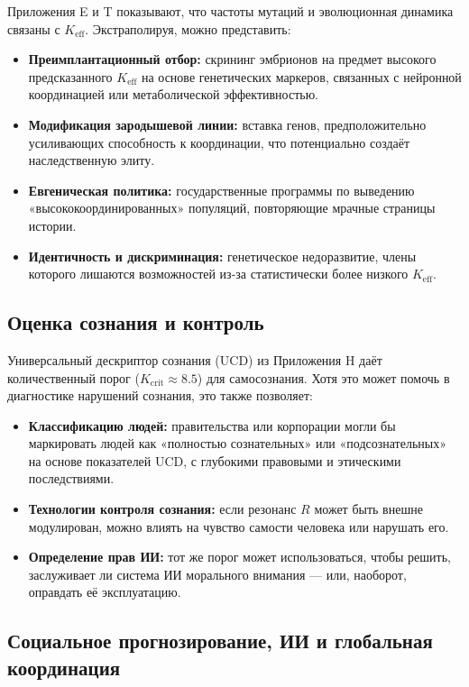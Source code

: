 \documentclass[12pt,a4paper]{article}
\theoremstyle{remark}
\newcommand{\Keff}{K_{\mathrm{eff}}}
\newcommand{\Kcrit}{K_{\mathrm{crit}}}
\begin{document}
	Приложения E и T показывают, что частоты мутаций и эволюционная динамика связаны с \(\Keff\). Экстраполируя, можно представить:
	\begin{itemize}[leftmargin=*]
		\item \textbf{Преимплантационный отбор:} скрининг эмбрионов на предмет высокого предсказанного \(\Keff\) на основе генетических маркеров, связанных с нейронной координацией или метаболической эффективностью.
		\item \textbf{Модификация зародышевой линии:} вставка генов, предположительно усиливающих способность к координации, что потенциально создаёт наследственную элиту.
		\item \textbf{Евгеническая политика:} государственные программы по выведению «высококоординированных» популяций, повторяющие мрачные страницы истории.
		\item \textbf{Идентичность и дискриминация:} генетическое недоразвитие, члены которого лишаются возможностей из-за статистически более низкого \(\Keff\).
	\end{itemize}
	
	\subsection{Оценка сознания и контроль}
	\label{subsec:consciousness}
	
	Универсальный дескриптор сознания (UCD) из Приложения H даёт количественный порог (\(\Kcrit \approx 8.5\)) для самосознания. Хотя это может помочь в диагностике нарушений сознания, это также позволяет:
	\begin{itemize}[leftmargin=*]
		\item \textbf{Классификацию людей:} правительства или корпорации могли бы маркировать людей как «полностью сознательных» или «подсознательных» на основе показателей UCD, с глубокими правовыми и этическими последствиями.
		\item \textbf{Технологии контроля сознания:} если резонанс \(R\) может быть внешне модулирован, можно влиять на чувство самости человека или нарушать его.
		\item \textbf{Определение прав ИИ:} тот же порог может использоваться, чтобы решить, заслуживает ли система ИИ морального внимания — или, наоборот, оправдать её эксплуатацию.
	\end{itemize}
	
	\subsection{Социальное прогнозирование, ИИ и глобальная координация}
	\label{subsec:social}
	
\end{document}
